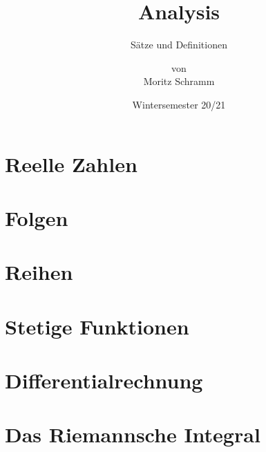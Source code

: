 \documentclass[a4paper, 12pt]{report}
\institute{Universität Bayreuth}
\title{Analysis}
\subtitle{Sätze und Definitionen}
\author{von\\Moritz Schramm}%
\date{Wintersemester 20/21}
\begin{document}
	\maketitle
	\romantableofcontents
	
	\chapter{Reelle Zahlen}
	
	
	\chapter{Folgen}
	
	
	\chapter{Reihen}
	
	
	\chapter{Stetige Funktionen}
	
	
	\chapter{Differentialrechnung}
	
	
	\chapter{Das Riemannsche Integral}
	
	
\end{document}
